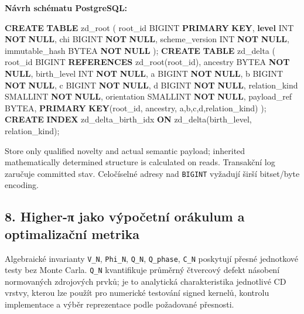 \documentclass[
  10pt,
]{article}
\newenvironment{Shaded}{}{}
\newcommand{\DataTypeTok}[1]{\textcolor[rgb]{0.56,0.13,0.00}{#1}}
\newcommand{\KeywordTok}[1]{\textcolor[rgb]{0.00,0.44,0.13}{\textbf{#1}}}
\newcommand{\NormalTok}[1]{#1}
\begin{document}
\textbf{Návrh schématu PostgreSQL:}

\begin{Shaded}
\begin{Highlighting}[]
\KeywordTok{CREATE} \KeywordTok{TABLE}\NormalTok{ zd\_root (}
\NormalTok{  root\_id BIGINT }\KeywordTok{PRIMARY} \KeywordTok{KEY}\NormalTok{,}
  \KeywordTok{level} \DataTypeTok{INT} \KeywordTok{NOT} \KeywordTok{NULL}\NormalTok{,}
\NormalTok{  chi BIGINT }\KeywordTok{NOT} \KeywordTok{NULL}\NormalTok{,}
\NormalTok{  scheme\_version }\DataTypeTok{INT} \KeywordTok{NOT} \KeywordTok{NULL}\NormalTok{,}
\NormalTok{  immutable\_hash BYTEA }\KeywordTok{NOT} \KeywordTok{NULL}
\NormalTok{);}
\KeywordTok{CREATE} \KeywordTok{TABLE}\NormalTok{ zd\_delta (}
\NormalTok{  root\_id BIGINT }\KeywordTok{REFERENCES}\NormalTok{ zd\_root(root\_id),}
\NormalTok{  ancestry BYTEA }\KeywordTok{NOT} \KeywordTok{NULL}\NormalTok{,}
\NormalTok{  birth\_level }\DataTypeTok{INT} \KeywordTok{NOT} \KeywordTok{NULL}\NormalTok{,}
\NormalTok{  a BIGINT }\KeywordTok{NOT} \KeywordTok{NULL}\NormalTok{, b BIGINT }\KeywordTok{NOT} \KeywordTok{NULL}\NormalTok{,}
\NormalTok{  c BIGINT }\KeywordTok{NOT} \KeywordTok{NULL}\NormalTok{, d BIGINT }\KeywordTok{NOT} \KeywordTok{NULL}\NormalTok{,}
\NormalTok{  relation\_kind }\DataTypeTok{SMALLINT} \KeywordTok{NOT} \KeywordTok{NULL}\NormalTok{,}
\NormalTok{  orientation }\DataTypeTok{SMALLINT} \KeywordTok{NOT} \KeywordTok{NULL}\NormalTok{,}
\NormalTok{  payload\_ref BYTEA,}
  \KeywordTok{PRIMARY} \KeywordTok{KEY}\NormalTok{(root\_id, ancestry, a,b,c,d,relation\_kind)}
\NormalTok{);}
\KeywordTok{CREATE} \KeywordTok{INDEX}\NormalTok{ zd\_delta\_birth\_idx }\KeywordTok{ON}\NormalTok{ zd\_delta(birth\_level, relation\_kind);}
\end{Highlighting}
\end{Shaded}

Store only qualified novelty and actual semantic payload; inherited
mathematically determined structure is calculated on reads. Transakční
log zaručuje committed stav. Celočíselné adresy nad \texttt{BIGINT}
vyžadují širší bitset/byte encoding.

\subsection{8. Higher-π jako výpočetní orákulum a optimalizační
metrika}\label{higher-ux3c0-jako-vuxfdpoux10detnuxed-oruxe1kulum-a-optimalizaux10dnuxed-metrika}

Algebraické invarianty \texttt{V\_N}, \texttt{Phi\_N}, \texttt{Q\_N},
\texttt{Q\_phase}, \texttt{C\_N} poskytují přesné jednotkové testy bez
Monte Carla. \texttt{Q\_N} kvantifikuje průměrný čtvercový defekt
násobení normovaných zdrojových prvků; je to analytická charakteristika
jednotlivé CD vrstvy, kterou lze použít pro numerické testování signed
kernelů, kontrolu implementace a výběr reprezentace podle požadované
přesnosti.
\end{document}
